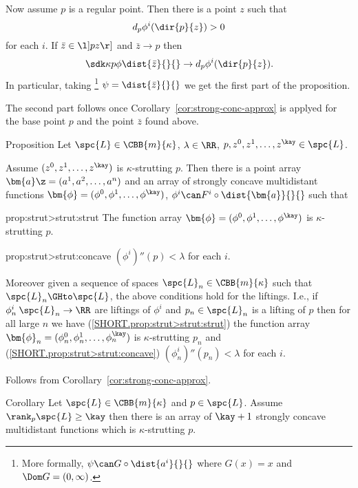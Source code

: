 Now assume $p$ is a regular point. 
Then there is a point $z$ such that 
\[d_p\phi^i(\dir{p}{z})>0\]
for each $i$.
If $\bar z\in\l]pz\r]$ and $\bar z\to p$
then
\[\sdk\kappa p{\phi}{\dist{\bar z}{}{}}\to d_p\phi^i(\dir{p}{z}).\]
In particular, 
taking%
\footnote{More formally, $\psi\can G\circ\dist{a^i}{}{}$ where $G(x)=x$ and $\Dom G=(0,\infty)$.} $\psi=\dist{\bar z}{}{}$ we get the first part of the proposition. 

The second part follows once Corollary~\ref{cor:strong-conc-approx} is applyed for the base point $p$ and the point $\bar z$ found above.
\qeds

\begin{thm}{Proposition}\label{prop:strut>strut}
Let $\spc{L}\in\CBB{m}{\kappa}$,
$\lambda\in\RR$,
$p,z^0,z^1,\dots,z^\kay\in \spc{L}$.

Assume $(z^0,z^1,\dots,z^\kay)$ is $\kappa$-strutting $p$.
Then there is a point array
$\bm{a}\z=(a^1,a^2,\dots, a^{n})$
and an array of strongly concave multidistant functions 
$\bm{\phi}=(\phi^0,\phi^1,\dots,\phi^\kay)$, 
$\phi^i\can F^i\circ\dist{\bm{a}}{}{}$
such that 

\begin{subthm}{prop:strut>strut:strut}
The function array $\bm{\phi}=(\phi^0,\phi^1,\dots,\phi^\kay)$ is $\kappa$-strutting $p$.
\end{subthm}

\begin{subthm}{prop:strut>strut:concave}
$(\phi^i)''(p)<\lambda$ for each $i$.
\end{subthm}

Moreover given a sequence of spaces $\spc{L}_n\in\CBB{m}{\kappa}$
such that $\spc{L}_n\GHto \spc{L}$,
the above conditions hold for the liftings.
I.e., if $\phi_n^i\:\spc{L}_n\to\RR$ 
are liftings of $\phi^i$ 
and $p_n\in \spc{L}_n$ is a lifting of $p$
then 
for all large $n$ we have
(\ref{SHORT.prop:strut>strut:strut})
the function array $\bm{\phi}_n=(\phi_n^0,\phi_n^1,\dots,\phi_n^\kay)$ is $\kappa$-strutting $p_n$
and 
(\ref{SHORT.prop:strut>strut:concave}) $(\phi_n^i)''(p_n)<\lambda$ for each $i$.
\end{thm}

Follows from Corollary~\ref{cor:strong-conc-approx}.
\qeds

\begin{thm}{Corollary}
Let $\spc{L}\in\CBB{m}{\kappa}$ and $p\in  \spc{L}$.
Assume $\rank_p\spc{L}\ge \kay$
then there is an array 
of $\kay+1$ strongly concave
multidistant functions which is $\kappa$-strutting $p$.
\end{thm}

